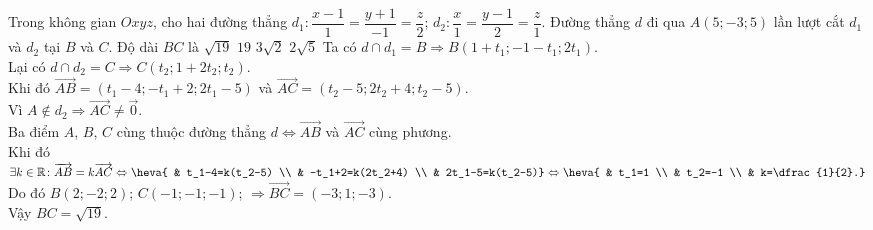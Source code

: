\begin{ex}%
Trong không gian $Oxyz$, cho hai đường thẳng $d_1\colon \dfrac{x-1}{1}=\dfrac{y+1}{-1}=\dfrac{z}{2}$; $d_2\colon \dfrac{x}{1}=\dfrac{y-1}{2}=\dfrac{z}{1}$. Đường thẳng $d$ đi qua $A(5;-3;5)$ lần lượt cắt $d_1$ và $d_2$ tại $B$ và $C$. Độ dài $BC$ là
\choice
{\True $\sqrt{19}$}
{$19$}
{$3\sqrt{2}$}
{$2\sqrt{5}$}
\loigiai
{
Ta có $d\cap d_1=B \Rightarrow B(1+t_1;-1-t_1;2t_1)$.\\
Lại có $d\cap d_2=C \Rightarrow C(t_2;1+2t_2;t_2)$.\\
Khi đó $\overrightarrow{AB}=(t_1-4;-t_1+2;2t_1-5)$ và $\overrightarrow{AC}=(t_2-5;2t_2+4;t_2-5)$.\\
Vì $A\notin d_2 \Rightarrow \overrightarrow{AC}\ne\overrightarrow{0}$.\\
Ba điểm $A$, $B$, $C$ cùng thuộc đường thẳng $d \Leftrightarrow \overrightarrow{AB}$ và $\overrightarrow{AC}$ cùng phương.\\
Khi đó $\exists k \in \mathbb{R} \colon \overrightarrow{AB}=k\overrightarrow{AC} \Leftrightarrow \heva{ & t_1-4=k(t_2-5) \\ & -t_1+2=k(2t_2+4) \\ & 2t_1-5=k(t_2-5)} \Leftrightarrow \heva{ & t_1=1 \\ & t_2=-1 \\ & k=\dfrac{1}{2}.}$\\
Do đó $B(2;-2;2)$; $C(-1;-1;-1)$; $\Rightarrow \overrightarrow{BC}=(-3;1;-3)$.\\
Vậy $BC=\sqrt{19}$.
}
\end{ex}
